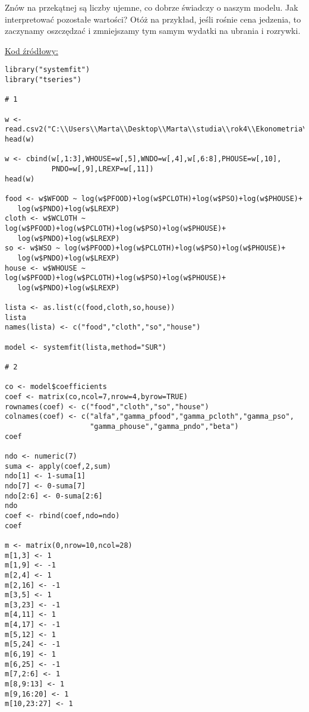 \documentclass[11pt,a4paper]{report}
\begin{document}
Znów na przekątnej są liczby ujemne, co dobrze świadczy o naszym modelu. Jak interpretować pozostałe wartości? Otóż na przykład, jeśli rośnie cena jedzenia, to zaczynamy oszczędzać i zmniejszamy tym samym wydatki na ubrania i rozrywki.

\newpage

\underline{Kod źródłowy:}

\lstset{language=R} 
\begin{small}
\begin{lstlisting}
library("systemfit")
library("tseries")

# 1

w <- read.csv2("C:\\Users\\Marta\\Desktop\\Marta\\studia\\rok4\\Ekonometria\\spr4\\AIDS.csv")
head(w)

w <- cbind(w[,1:3],WHOUSE=w[,5],WNDO=w[,4],w[,6:8],PHOUSE=w[,10],
           PNDO=w[,9],LREXP=w[,11])
head(w)

food <- w$WFOOD ~ log(w$PFOOD)+log(w$PCLOTH)+log(w$PSO)+log(w$PHOUSE)+
   log(w$PNDO)+log(w$LREXP)
cloth <- w$WCLOTH ~ log(w$PFOOD)+log(w$PCLOTH)+log(w$PSO)+log(w$PHOUSE)+
   log(w$PNDO)+log(w$LREXP)
so <- w$WSO ~ log(w$PFOOD)+log(w$PCLOTH)+log(w$PSO)+log(w$PHOUSE)+
   log(w$PNDO)+log(w$LREXP)
house <- w$WHOUSE ~ log(w$PFOOD)+log(w$PCLOTH)+log(w$PSO)+log(w$PHOUSE)+
   log(w$PNDO)+log(w$LREXP)

lista <- as.list(c(food,cloth,so,house))
lista
names(lista) <- c("food","cloth","so","house")

model <- systemfit(lista,method="SUR")

# 2

co <- model$coefficients
coef <- matrix(co,ncol=7,nrow=4,byrow=TRUE)
rownames(coef) <- c("food","cloth","so","house")
colnames(coef) <- c("alfa","gamma_pfood","gamma_pcloth","gamma_pso",
                    "gamma_phouse","gamma_pndo","beta")
coef

ndo <- numeric(7)
suma <- apply(coef,2,sum)
ndo[1] <- 1-suma[1]
ndo[7] <- 0-suma[7]
ndo[2:6] <- 0-suma[2:6]
ndo
coef <- rbind(coef,ndo=ndo)
coef

m <- matrix(0,nrow=10,ncol=28)
m[1,3] <- 1
m[1,9] <- -1
m[2,4] <- 1
m[2,16] <- -1
m[3,5] <- 1
m[3,23] <- -1
m[4,11] <- 1
m[4,17] <- -1
m[5,12] <- 1
m[5,24] <- -1
m[6,19] <- 1
m[6,25] <- -1
m[7,2:6] <- 1
m[8,9:13] <- 1
m[9,16:20] <- 1
m[10,23:27] <- 1


\end{lstlisting}
\end{small}
\end{document}
